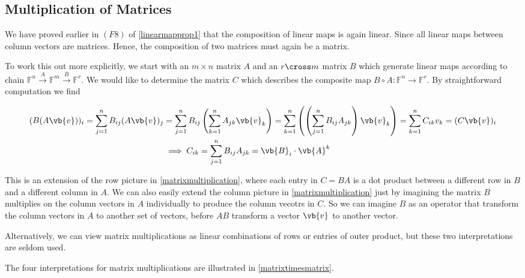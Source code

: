 \documentclass[a4paper,12pt]{report}
\begin{document}
\subsection{Multiplication of Matrices}

We have proved earlier in \((F8)\)  of \cref{linearmapprop1} that the composition of linear maps is again linear. Since all linear maps between column vectors are matrices. Hence, the composition of two matrices must again be a matrix. 

To work this out more explicitly, we start with an \(m \times n\) matrix \(A\) and an \(r \cross m\) matrix \(B\) which generate linear maps according to chain \(\mathbb{F}^{n} \stackrel{A}{\rightarrow } \mathbb{F}^{m} \stackrel{B}{\rightarrow } \mathbb{F}^{r}   \). We would like to determine the matrix \(C\) which describes the composite map \(B \circ A: \mathbb{F}^{n} \rightarrow \mathbb{F}^{r}  \). By straightforward computation we find

\begin{equation}
    \begin{aligned}
    (B(A\vb{v} ))_{i} = \sum_{j=1}^{n} B_{ij} (A\vb{v} )_{j} &= \sum_{j=1}^{n} B_{ij} \left( \sum_{k=1}^{n} A_{jk}\vb{v} _{k}\right) = \sum_{k=1}^{n} \left( \left(\sum_{j=1}^{n} B_{ij} A_{jk}  \right) \vb{v} _{k} \right)= \sum_{k=1}^{n} C_{ik} v_{k} = (C\vb{v} )_{i} \\
    &\implies C_{ik} = \sum_{j=1}^{n} B_{ij} A_{jk} = \vb{B} _{i} \cdot \vb{A} ^{k} 
    \end{aligned}
\end{equation}

This is an extension of the row picture in \cref{matrixmultiplication}, where each entry in \(C = BA\) is a dot product between a different row in \(B\) and a different column in \(A\). We can also easily extend the column picture in \cref{matrixmultiplication} just by imagining the matrix \(B\) multiplies on the column vectors in \(A\) individually to produce the column vecotrs in \(C\). So we can imagine \(B\) as an operator that transform the column vectors in \(A\) to another set of vectors, before \(AB\) transform a vector \(\vb{v} \) to another vector. 

Alternatively, we can view matrix multiplications as linear combinations of rows or entries of outer product, but these two interpretations are seldom used.

The four interpretations for matrix multiplications are illustrated in \cref{matrixtimesmatrix}.
\end{document}
